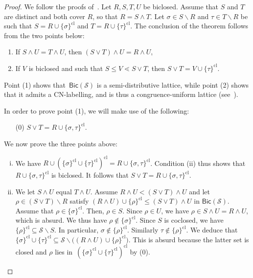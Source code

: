 \documentclass{memo-l}
\theoremstyle{definition}
\newcommand{\cS}{\mathcal{S}} %
\newcommand{\ssm}{\smallsetminus} %
\newcommand{\closure}[1]{#1^{\mathrm{cl}}} %
\newcommand{\Bicl}[1]{\mathsf{Bic}(#1)} %
\begin{document}
\begin{proof}
We follow the proofs of~\cite[Thm.~5.2 \& Thm.~5.5]{McConville}. 
Let $R,S,T,U$ be biclosed.
Assume that $S$ and $T$ are distinct and both cover $R$, so that $R = S \wedge T$.
Let $\sigma \in S\ssm R$ and $\tau \in T \ssm R$ be such that $S = R \cup \closure{\{\sigma\}}$ and $T = R \cup \closure{\{\tau\}}$.
The conclusion of the theorem follows from the two points below:
\begin{enumerate}
 \item If $S \wedge U = T \wedge U$, then $(S\vee T) \wedge U = R \wedge U$,
 \item If $V$ is biclosed and such that $S \leq V \lessdot S \vee T$, then $S\vee T = V \cup \closure{\{\tau\}}$.
\end{enumerate}
Point (1) shows that~$\Bicl{\cS}$ is a semi-distributive lattice, while point (2) shows that it admits a CN-labelling, and is thus a congruence-uniform lattice (see~\cite[Thm.~4]{Reading-HyperplaneArrangement}).

In order to prove point (1), we will make use of the following:
\begin{itemize}
 \item[(0)] $S\vee T = R\cup\closure{\{\sigma,\tau\}}$.
\end{itemize}

We now prove the three points above:

\begin{enumerate}[(i)]
\item We have $R \cup \closure{(\closure{\{\sigma\}} \cup \closure{\{\tau\}} )} =   R \cup \closure{\{\sigma,\tau\}}$.
Condition (ii) thus shows that $R \cup \closure{\{\sigma,\tau\}}$ is biclosed.
It follows that $S\vee T = R \cup \closure{\{\sigma,\tau\}}$.

\item We let $S\wedge U$ equal $T\wedge U$. Assume $R\wedge U < (S\vee T)\wedge U$ and let $\rho \in (S\vee T) \ssm R$ satisfy $(R\wedge U) \cup \closure{\{\rho\}} \leq (S\vee T)\wedge U$ in $\Bicl{\cS}$.
Assume that $\rho\in\closure{\{\sigma\}}$.
Then, $\rho\in S$.
Since $\rho\in U$, we have ${\rho \in S \wedge U = R \wedge U}$, which is absurd.
We thus have $\rho \notin \closure{\{\sigma\}}$.
Since $S$ is coclosed, we have $\closure{\{\rho\}} \subseteq \cS\ssm S$.
In particular, $\sigma \notin \closure{\{\rho\}}$.
Similarly $\tau \notin \closure{\{\rho\}}$.
We deduce that ${\closure{\{\sigma\}} \cup \closure{\{\tau\}} \subseteq \cS\ssm \big( (R\wedge U) \cup \closure{\{\rho\}} \big)}$.
This is absurd because the latter set is closed and $\rho$ lies in~$\closure{( \closure{\{\sigma\}} \cup \closure{\{\tau\}} )}$ by (0).


\end{enumerate}
\end{proof}
\end{document}
